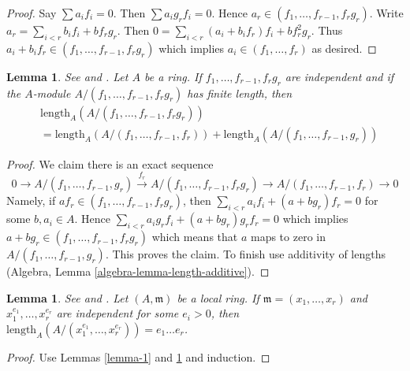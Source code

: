 \documentclass{stacks-project}
\newenvironment{reference}{\comment}{\endcomment}
\theoremstyle{plain}
\newtheorem{lemma}[subsection]{Lemma}
\theoremstyle{definition}
\theoremstyle{remark}
\numberwithin{equation}{subsection}
\begin{document}
\begin{proof}
Say $\sum a_if_i = 0$. Then $\sum a_ig_rf_i = 0$.
Hence $a_r \in (f_1, \ldots, f_{r - 1}, f_rg_r)$.
Write $a_r = \sum_{i < r} b_i f_i + b f_rg_r$.
Then $0 = \sum_{i < r} (a_i + b_if_r)f_i + bf_r^2g_r$.
Thus $a_i + b_i f_r \in (f_1, \ldots, f_{r - 1}, f_rg_r)$
which implies $a_i \in (f_1, \ldots, f_r)$ as desired.
\end{proof}

\begin{lemma}
\label{lemma-2}
\begin{reference}
See \cite{Lech-inequalities} and \cite[Lemma 2 page 300]{MatCA}.
\end{reference}
Let $A$ be a ring. If $f_1, \ldots, f_{r - 1}, f_rg_r$
are independent and if the $A$-module
$A/(f_1, \ldots, f_{r - 1}, f_rg_r)$ has finite length, then
\begin{align*}
& \text{length}_A(A/(f_1, \ldots, f_{r - 1}, f_rg_r)) \\
& =
\text{length}_A(A/(f_1, \ldots, f_{r - 1}, f_r)) +
\text{length}_A(A/(f_1, \ldots, f_{r - 1}, g_r))
\end{align*}
\end{lemma}

\begin{proof}
We claim there is an exact sequence
$$
0 \to
A/(f_1, \ldots, f_{r - 1}, g_r) \xrightarrow{f_r}
A/(f_1, \ldots, f_{r - 1}, f_rg_r) \to
A/(f_1, \ldots, f_{r - 1}, f_r) \to 0
$$
Namely, if $a f_r \in (f_1, \ldots, f_{r - 1}, f_rg_r)$, then
$\sum_{i < r} a_i f_i + (a + bg_r)f_r = 0$
for some $b, a_i \in A$. Hence
$\sum_{i < r} a_i g_r f_i + (a + bg_r)g_rf_r = 0$
which implies $a + bg_r \in (f_1, \ldots, f_{r - 1}, f_rg_r)$
which means that $a$ maps to zero in $A/(f_1, \ldots, f_{r - 1}, g_r)$.
This proves the claim.
To finish use additivity of lengths
(Algebra, Lemma \ref{algebra-lemma-length-additive}).
\end{proof}

\begin{lemma}
\label{lemma-3}
\begin{reference}
See \cite{Lech-inequalities} and \cite[Lemma 3 page 300]{MatCA}.
\end{reference}
Let $(A, \mathfrak m)$ be a local ring. If $\mathfrak m = (x_1, \ldots, x_r)$
and $x_1^{e_1}, \ldots, x_r^{e_r}$ are independent for some $e_i > 0$,
then $\text{length}_A(A/(x_1^{e_1}, \ldots, x_r^{e_r})) = e_1\ldots e_r$.
\end{lemma}

\begin{proof}
Use Lemmas \ref{lemma-1} and \ref{lemma-2} and induction.
\end{proof}
\end{document}
